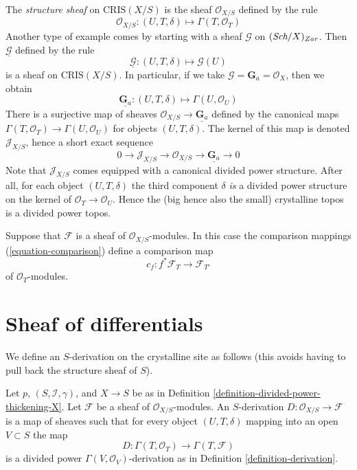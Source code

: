 \medskip\noindent
The {\it structure sheaf} on $\text{CRIS}(X/S)$ is the sheaf
$\mathcal{O}_{X/S}$ defined by the rule
$$
\mathcal{O}_{X/S} :
(U, T, \delta)
\longmapsto
\Gamma(T, \mathcal{O}_T)
$$
Another type of example comes by starting with a sheaf
$\mathcal{G}$ on $(\textit{Sch}/X)_{Zar}$. Then $\underline{\mathcal{G}}$
defined by the rule
$$
\underline{\mathcal{G}} :
(U, T, \delta)
\longmapsto
\mathcal{G}(U)
$$
is a sheaf on $\text{CRIS}(X/S)$. In particular, if we take
$\mathcal{G} = \mathbf{G}_a = \mathcal{O}_X$, then we obtain
$$
\underline{\mathbf{G}_a} :
(U, T, \delta)
\longmapsto
\Gamma(U, \mathcal{O}_U)
$$
There is a surjective map of sheaves
$\mathcal{O}_{X/S} \to \underline{\mathbf{G}_a}$ defined by the
canonical maps $\Gamma(T, \mathcal{O}_T) \to \Gamma(U, \mathcal{O}_U)$
for objects $(U, T, \delta)$. The kernel of this map is denoted
$\mathcal{J}_{X/S}$, hence a short exact sequence
$$
0 \to
\mathcal{J}_{X/S} \to
\mathcal{O}_{X/S} \to
\underline{\mathbf{G}_a} \to 0
$$
Note that $\mathcal{J}_{X/S}$ comes equipped with a canonical
divided power structure. After all, for each object $(U, T, \delta)$
the third component $\delta$ {\it is} a divided power structure on the
kernel of $\mathcal{O}_T \to \mathcal{O}_U$. Hence the (big hence also
the small) crystalline topos is a divided power topos.

\medskip\noindent
Suppose that $\mathcal{F}$ is a sheaf of $\mathcal{O}_{X/S}$-modules.
In this case the comparison mappings (\ref{equation-comparison})
define a comparison map
\begin{equation}
\label{equation-comparison-modules}
c_f : f^*\mathcal{F}_T \longrightarrow \mathcal{F}_{T'}
\end{equation}
of $\mathcal{O}_T$-modules.




\section{Sheaf of differentials}
\label{section-differentials-sheaf}

\noindent
We define an $S$-derivation on the crystalline site
as follows (this avoids having to pull back the structure sheaf of $S$).

\begin{definition}
\label{definition-global-derivation}
Let $p$, $(S, \mathcal{I}, \gamma)$, and $X \to S$ be as in
Definition \ref{definition-divided-power-thickening-X}.
Let $\mathcal{F}$ be a sheaf of $\mathcal{O}_{X/S}$-modules.
An $S$-derivation $D : \mathcal{O}_{X/S} \to \mathcal{F}$
is a map of sheaves such that for every object $(U, T, \delta)$
mapping into an open $V \subset S$ the map
$$
D : \Gamma(T, \mathcal{O}_T) \longrightarrow \Gamma(T, \mathcal{F})
$$
is a divided power $\Gamma(V, \mathcal{O}_V)$-derivation as in
Definition \ref{definition-derivation}.
\end{definition}

